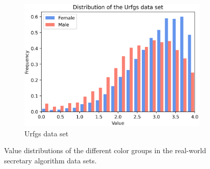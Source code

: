 \begin{figure}[h!]
\begin{subfigure}[t]{0.32\textwidth}
        \includegraphics[width=1\textwidth]{media/Images_plots/dataset_distribution_Urfgs.png}
        \caption{Urfgs data set}
        \label{distribution_ufrgs}
    \end{subfigure}
    \caption{Value distributions of the different color groups in the real-world secretary algorithm data sets.}
    \label{fig:distributions}
\end{figure}


